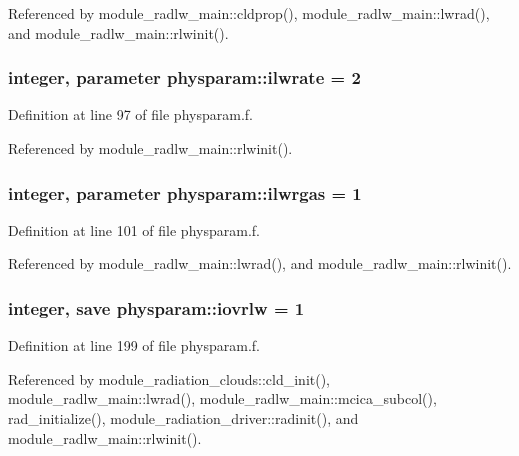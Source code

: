 Referenced by module\+\_\+radlw\+\_\+main\+::cldprop(), module\+\_\+radlw\+\_\+main\+::lwrad(), and module\+\_\+radlw\+\_\+main\+::rlwinit().

\subsubsection[{\texorpdfstring{ilwrate}{ilwrate}}]{\setlength{\rightskip}{0pt plus 5cm}integer, parameter physparam\+::ilwrate = 2}\hypertarget{namespacephysparam_a8db5b34f68cb0e3698aa1c200fecd880}{}\label{namespacephysparam_a8db5b34f68cb0e3698aa1c200fecd880}


Definition at line 97 of file physparam.\+f.



Referenced by module\+\_\+radlw\+\_\+main\+::rlwinit().

\subsubsection[{\texorpdfstring{ilwrgas}{ilwrgas}}]{\setlength{\rightskip}{0pt plus 5cm}integer, parameter physparam\+::ilwrgas = 1}\hypertarget{namespacephysparam_a0658ae9417d6c79963e41e7d2a598309}{}\label{namespacephysparam_a0658ae9417d6c79963e41e7d2a598309}


Definition at line 101 of file physparam.\+f.



Referenced by module\+\_\+radlw\+\_\+main\+::lwrad(), and module\+\_\+radlw\+\_\+main\+::rlwinit().

\subsubsection[{\texorpdfstring{iovrlw}{iovrlw}}]{\setlength{\rightskip}{0pt plus 5cm}integer, save physparam\+::iovrlw = 1}\hypertarget{namespacephysparam_a644d850cdfb6dd159e51223f715683f6}{}\label{namespacephysparam_a644d850cdfb6dd159e51223f715683f6}


Definition at line 199 of file physparam.\+f.



Referenced by module\+\_\+radiation\+\_\+clouds\+::cld\+\_\+init(), module\+\_\+radlw\+\_\+main\+::lwrad(), module\+\_\+radlw\+\_\+main\+::mcica\+\_\+subcol(), rad\+\_\+initialize(), module\+\_\+radiation\+\_\+driver\+::radinit(), and module\+\_\+radlw\+\_\+main\+::rlwinit().

